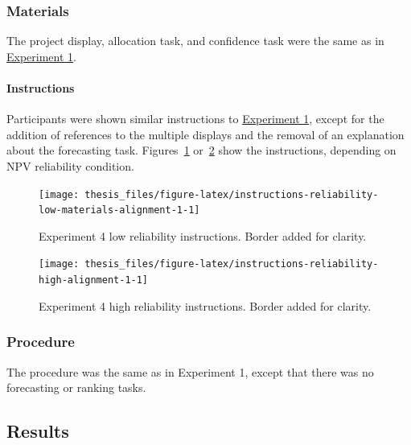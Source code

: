 \documentclass[a4paper, nobind, dvipsnames]{templates/ociamthesis}
\theoremstyle{definition}
\theoremstyle{definition}
\theoremstyle{definition}
\theoremstyle{definition}
\theoremstyle{remark}
\begin{document}
\subsubsection{Materials}

The project display, allocation task, and confidence task were the same as in
\protect\hyperlink{materials-alignment-2}{Experiment 1}.

\paragraph{Instructions}

Participants were shown similar instructions to \protect\hyperlink{instructions-materials-alignment-2}{Experiment
1}, except for the addition of references
to the multiple displays and the removal of an explanation about the forecasting
task. Figures~\ref{fig:instructions-reliability-low-materials-alignment-1}
or~\ref{fig:instructions-reliability-high-alignment-1} show the instructions,
depending on NPV reliability condition.



\begin{figure}
\texttt{[image: thesis\_files/figure-latex/instructions-reliability-low-materials-alignment-1-1]} \caption{Experiment 4 low reliability instructions. Border added for clarity.}\label{fig:instructions-reliability-low-materials-alignment-1}
\end{figure}



\begin{figure}
\texttt{[image: thesis\_files/figure-latex/instructions-reliability-high-alignment-1-1]} \caption{Experiment 4 high reliability instructions. Border added for clarity.}\label{fig:instructions-reliability-high-alignment-1}
\end{figure}

\subsubsection{Procedure}

The procedure was the same as in Experiment 1, except that there was no
forecasting or ranking tasks.

\hypertarget{results-alignment-1}{%
\subsection{Results}\label{results-alignment-1}}
\end{document}
